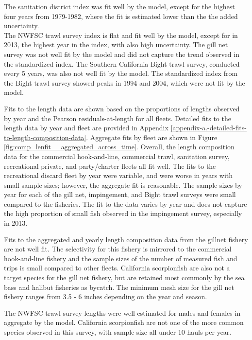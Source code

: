 \documentclass[12pt,]{article}
\begin{document}
The sanitation district index was fit well by the model, except for the
highest four years from 1979-1982, where the fit is estimated lower than
the the added uncertainty.\\
The NWFSC trawl survey index is flat and fit well by the model, except
for in 2013, the highest year in the index, with also high uncertainty.
The gill net survey was not well fit by the model and did not capture
the trend observed in the standardized index. The Southern California
Bight trawl survey, conducted every 5 years, was also not well fit by
the model. The standardized index from the Bight trawl survey showed
peaks in 1994 and 2004, which were not fit by the model.

Fits to the length data are shown based on the proportions of lengths
observed by year and the Pearson residuals-at-length for all fleets.
Detailed fits to the length data by year and fleet are provided in
Appendix \ref{appendix-a.-detailed-fits-to-length-composition-data}.
Aggregate fits by fleet are shown in Figure
\ref{fig:comp_lenfit__aggregated_across_time}. Overall, the length
composition data for the commercial hook-and-line, commercial trawl,
sanitation survey, recreational private, and party/charter fleets all
fit well. The fits to the recreational discard fleet by year were
variable, and were worse in years with small sample sizes; however, the
aggregate fit is reasonable. The sample sizes by year for each of the
gill net, impingement, and Bight trawl surveys were small compared to
the fisheries. The fit to the data varies by year and does not capture
the high proportion of small fish observed in the impingement survey,
especially in 2013.

Fits to the aggregated and yearly length composition data from the
gillnet fishery are not well fit. The selectivity for this fishery is
mirrored to the commercial hook-and-line fishery and the sample sizes of
the number of measured fish and trips is small compared to other fleets.
California scorpionfish are also not a target species for the gill net
fishery, but are retained most commonly by the sea bass and halibut
fisheries as bycatch. The minimum mesh size for the gill net fishery
ranges from 3.5 - 6 inches depending on the year and season.

The NWFSC trawl survey lengths were well estimated for males and females
in aggregate by the model. California scorpionfish are not one of the
more common species observed in this survey, with sample size all under
10 hauls per year.
\end{document}

